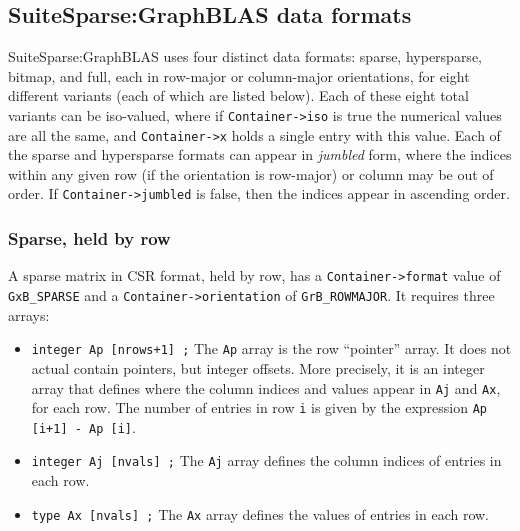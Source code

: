 \newpage
\subsection{SuiteSparse:GraphBLAS data formats}
\label{formats}

SuiteSparse:GraphBLAS uses four distinct data formats: sparse, hypersparse,
bitmap, and full, each in row-major or column-major orientations, for eight
different variants (each of which are listed below).
Each of these eight total variants can be iso-valued, where if
\verb'Container->iso' is true the numerical values are all the same, and
\verb'Container->x' holds a single entry with this value.
Each of the sparse and hypersparse formats can appear in {\em jumbled} form,
where the indices within any given row (if the orientation is row-major)
or column may be out of order.  If \verb'Container->jumbled' is false, then
the indices appear in ascending order.

\subsubsection{Sparse, held by row}
\label{format_sparse_by_row}

A sparse matrix in CSR format, held by row, has a \verb'Container->format'
value of \verb'GxB_SPARSE' and a \verb'Container->orientation' of
\verb'GrB_ROWMAJOR'.  It requires three arrays:

\begin{itemize}
\item \verb'integer Ap [nrows+1] ;'  The \verb'Ap' array is the row
``pointer'' array.  It does not actual contain pointers, but integer offsets.
More precisely, it is an integer array that defines where the column indices
and values appear in \verb'Aj' and \verb'Ax', for each row.  The number of
entries in row \verb'i' is given by the expression \verb'Ap [i+1] - Ap [i]'.

\item \verb'integer Aj [nvals] ;'  The \verb'Aj' array defines the
column indices of entries in each row.

\item \verb'type Ax [nvals] ;'  The \verb'Ax' array defines the values of
entries in each row.  
\end{itemize}


